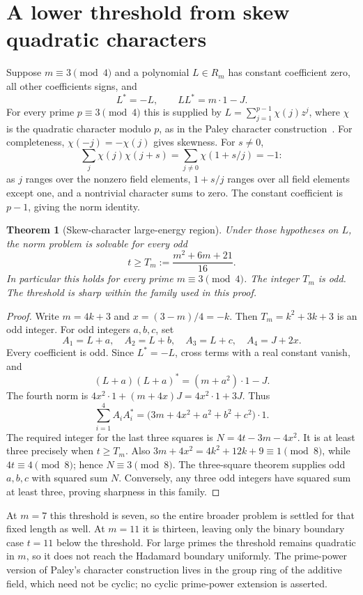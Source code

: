 \documentclass[11pt]{article}
\newtheorem{theorem}[proposition]{Theorem}
\begin{document}
\section*{A lower threshold from skew quadratic characters}
Suppose $m\equiv3\pmod4$ and a polynomial $L\in R_m$ has constant
coefficient zero, all other coefficients signs, and
\[
 L^*=-L,\qquad LL^*=m\cdot1-J.
\]
For every prime $p\equiv3\pmod4$ this is supplied by
$L=\sum_{j=1}^{p-1}\chi(j)z^j$, where $\chi$ is the quadratic character
modulo $p$, as in the Paley character construction~\cite{Paley}.
For completeness, $\chi(-j)=-\chi(j)$ gives skewness. For $s\ne0$,
\[
 \sum_j\chi(j)\chi(j+s)
 =\sum_{j\ne0}\chi(1+s/j)=-1:
\]
as $j$ ranges over the nonzero field elements, $1+s/j$ ranges over all
field elements except one, and a nontrivial character sums to zero.
The constant coefficient is $p-1$, giving the norm identity.

\begin{theorem}[Skew-character large-energy region]\label{thm:skew}
Under those hypotheses on $L$, the norm problem is solvable for every
odd
\[
 t\ge T_m:=\frac{m^2+6m+21}{16}.
\]
In particular this holds for every prime $m\equiv3\pmod4$.
The integer $T_m$ is odd. The threshold is sharp within the family
used in this proof.
\end{theorem}
\begin{proof}
Write $m=4k+3$ and $x=(3-m)/4=-k$. Then
$T_m=k^2+3k+3$ is an odd integer.
For odd integers $a,b,c$, set
\[
 A_1=L+a,\quad A_2=L+b,\quad A_3=L+c,\quad A_4=J+2x.
\]
Every coefficient is odd. Since $L^*=-L$, cross terms with a real
constant vanish, and
\[
 (L+a)(L+a)^*=(m+a^2)\cdot1-J.
\]
The fourth norm is $4x^2\cdot1+(m+4x)J=4x^2\cdot1+3J$.
Thus
\[
 \sum_{i=1}^4 A_iA_i^*
 =\bigl(3m+4x^2+a^2+b^2+c^2\bigr)\cdot1.
\]
The required integer for the last three squares is
$N=4t-3m-4x^2$. It is at least three precisely when $t\ge T_m$.
Also $3m+4x^2=4k^2+12k+9\equiv1\pmod8$, while $4t\equiv4\pmod8$;
hence $N\equiv3\pmod8$. The three-square theorem supplies odd
$a,b,c$ with squared sum $N$. Conversely, any three odd integers have
squared sum at least three, proving sharpness in this family.
\end{proof}

At $m=7$ this threshold is seven, so the entire broader problem is
settled for that fixed length as well. At $m=11$ it is thirteen, leaving
only the binary boundary case $t=11$ below the threshold. For large
primes the threshold remains quadratic in $m$, so it does not reach
the Hadamard boundary uniformly. The prime-power version of Paley's
character construction lives in the group ring of the additive field,
which need not be cyclic; no cyclic prime-power extension is asserted.
\end{document}
